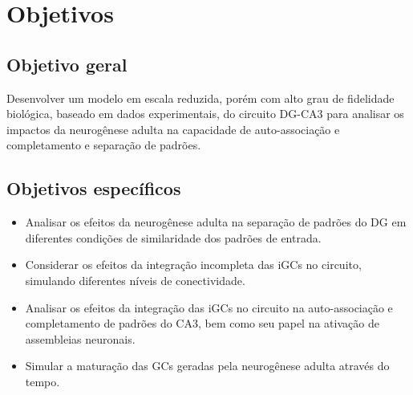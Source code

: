 \chapter{Objetivos}

\section{Objetivo geral}

Desenvolver um modelo em escala reduzida, porém com alto grau de fidelidade biológica, baseado em dados experimentais, do circuito
DG-CA3 para analisar os impactos da neurogênese adulta na capacidade de auto-associação e completamento e separação de padrões.

\section{Objetivos específicos}

\begin{itemize}
    \item Analisar os efeitos da neurogênese adulta na separação de padrões do DG em diferentes condições de similaridade dos
    padrões de entrada.
    \item Considerar os efeitos da integração incompleta das iGCs no circuito, simulando diferentes níveis de conectividade.
    \item Analisar os efeitos da integração das iGCs no circuito na auto-associação e completamento de padrões do CA3, bem como
    seu papel na ativação de assembleias neuronais.
    \item Simular a maturação das GCs geradas pela neurogênese adulta através do tempo.
\end{itemize}
